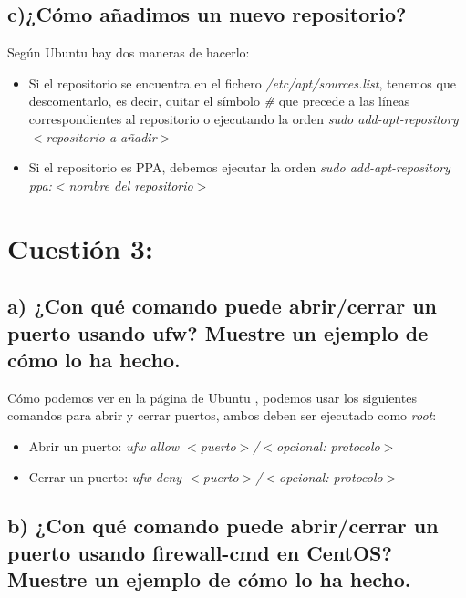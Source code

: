 \documentclass[a4paper,titlepage,12pt]{scrartcl}	%
\numberwithin{figure}{section} %
\numberwithin{table}{section} %
\begin{document}
	\subsection[c)¿Cómo añadimos un nuevo repositorio?]{c)¿Cómo añadimos un nuevo repositorio?}
	
	Según Ubuntu \cite{aptrepo} hay dos maneras de hacerlo:
	\begin{itemize}
		\item Si el repositorio se encuentra en el fichero \textit{/etc/apt/sources.list}, tenemos que descomentarlo, es decir, quitar el símbolo \textit{\#} que precede a las líneas correspondientes al repositorio o ejecutando la orden \textit{sudo add-apt-repository $<$repositorio a añadir$>$}
		\item Si el repositorio es PPA, debemos ejecutar la orden \textit{sudo add-apt-repository ppa:$<$nombre del repositorio$>$}
	\end{itemize}
	
	\section[Cuestión 3:]{Cuestión 3:}
	
	\subsection[a) ¿Con qué comando puede abrir/cerrar un puerto usando ufw? Muestre un ejemplo de cómo lo ha hecho.]{a) ¿Con qué comando puede abrir/cerrar un puerto usando ufw? Muestre un ejemplo de cómo lo ha hecho.}
	
	Cómo podemos ver en la página de Ubuntu \cite{ufw_puertos}, podemos usar los siguientes comandos para abrir y cerrar puertos, ambos deben ser ejecutado como \textit{root}:
	\begin{itemize}
		\item Abrir un puerto: \textit{ufw allow $<$puerto$>$/$<$opcional: protocolo$>$}
		\item Cerrar un puerto: \textit{ufw deny $<$puerto$>$/$<$opcional: protocolo$>$}
	\end{itemize}
	
	\subsection[b) ¿Con qué comando puede abrir/cerrar un puerto usando firewall-cmd en CentOS? Muestre un ejemplo de cómo lo ha hecho.]{b) ¿Con qué comando puede abrir/cerrar un puerto usando firewall-cmd en CentOS? Muestre un ejemplo de cómo lo ha hecho.}
	
\end{document}

